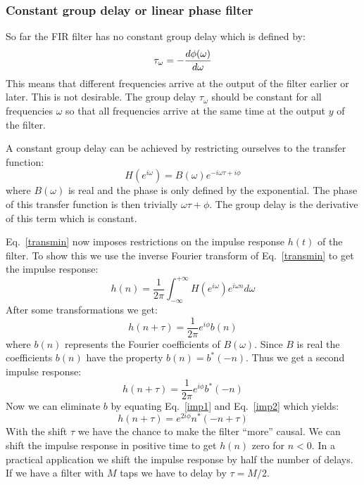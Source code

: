 \documentclass[12pt,a4paper]{article}
\begin{document}
\subsubsection{Constant group delay or linear phase filter}
So far the FIR filter has
no constant group delay which is defined by:
\begin{equation}
\tau_\omega= - {d\phi(\omega)\over d\omega}
\label{grpdelay}
\end{equation}
This means that different frequencies arrive at the output of the
filter earlier or later. This is not desirable. The group delay
$\tau_\omega$ should be constant for all frequencies $\omega$ so that
all frequencies arrive at the same time at the output $y$ of the
filter.

A constant group delay can be achieved by restricting ourselves to
the transfer function:
\begin{equation}
H(e^{i\omega})=B(\omega)e^{-i\omega\tau+i\phi} \label{transmin}
\end{equation}
where $B(\omega)$ is real and the phase is only defined by the exponential.
The phase of this transfer function is then trivially $\omega\tau+\phi$. The
group delay is the derivative of this term which is constant.

Eq.~\ref{transmin} now imposes restrictions on the impulse response $h(t)$
of the filter. To show this we use the inverse Fourier transform of
Eq.~\ref{transmin} to get the impulse response:
\begin{equation}
h(n)=\frac{1}{2\pi}\int_{-\infty}^{+\infty} H(e^{i\omega})
e^{i\omega n}d \omega
\end{equation}
After some transformations we get:
\begin{equation}
h(n+\tau)=\frac{1}{2\pi}e^{i\phi}b(n) \label{imp1}
\end{equation}
where $b(n)$ represents the Fourier coefficients of $B(\omega)$. Since $B$ is
real the coefficients $b(n)$ have the property $b(n)=b^*(-n)$.
Thus we get a second impulse response:
\begin{equation}
h(n+\tau)=\frac{1}{2\pi}e^{i\phi}b^*(-n) \label{imp2}
\end{equation}
Now we can eliminate $b$ by equating Eq.~\ref{imp1} and Eq.~\ref{imp2} which
yields:
\begin{equation}
h(n+\tau)=e^{2i\phi} n^*(-n+\tau)
\end{equation}
With the shift $\tau$ we have the chance to make the filter ``more''
causal. We can shift the impulse response in positive time to get
$h(n)$ zero for $n<0$. In a practical application we shift the impulse
response by half the number of delays. If we have a filter with $M$
taps we have to delay by $\tau=M/2$.
\end{document}
